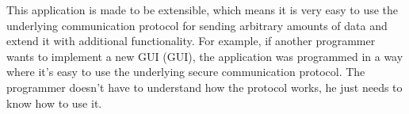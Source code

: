 This application is made to be extensible, which means it is very easy to use the underlying communication protocol for sending arbitrary amounts of data and extend it with additional functionality. For example, if another programmer wants to implement a new GUI (\acl{GUI}), the application was programmed in a way where it's easy to use the underlying secure communication protocol. The programmer doesn't have to understand how the protocol works, he just needs to know how to use it.
